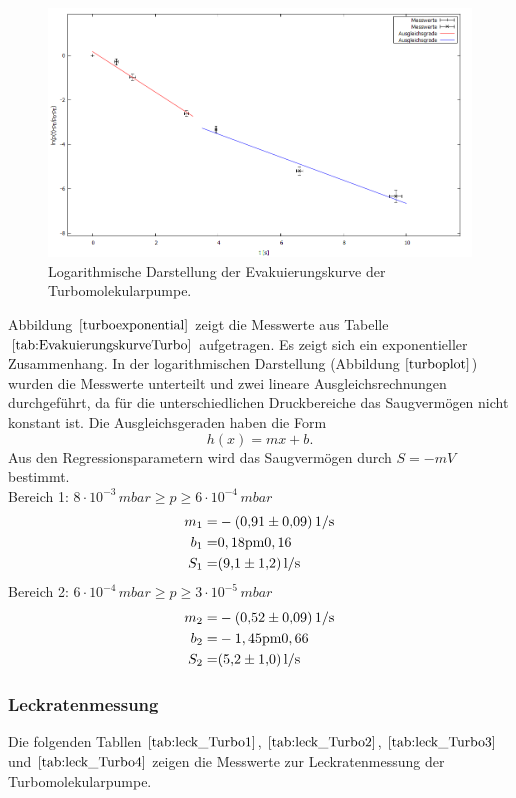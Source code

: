 \begin{figure}[H]
  \centering
  \includegraphics[width=14cm]{bilder/turbodruck plot.png}
  \caption{Logarithmische Darstellung der Evakuierungskurve der Turbomolekularpumpe.}
  \label{turboplot}
\end{figure}
Abbildung $\ref{turboexponential}$ zeigt die Messwerte aus Tabelle $\ref{tab:EvakuierungskurveTurbo}$ aufgetragen.
Es zeigt sich ein exponentieller Zusammenhang.
In der logarithmischen Darstellung (Abbildung $\ref{turboplot}$) wurden die Messwerte unterteilt und zwei lineare Ausgleichsrechnungen durchgeführt, da für die unterschiedlichen Druckbereiche das Saugvermögen nicht konstant ist.
Die Ausgleichsgeraden haben die Form
\begin{equation}
 h(x)=mx+b.
\end{equation}
Aus den Regressionsparametern wird das Saugvermögen durch $S=-mV$ bestimmt.\\

Bereich 1: $8 \cdot 10^{-3} \, \si{mbar} \geq p \geq 6 \cdot 10^{-4} \, \si{mbar}$\\
\begin{align*}
	m_1=& -\SI{0,91 \pm 0,09}{1/s}\\
	b_1=& \si{0,18 \pm 0,16}\\
	S_1=& \SI{9,1 \pm 1,2}{l/s}
\end{align*}
Bereich 2: $6 \cdot 10^{-4} \, \si{mbar} \geq p \geq 3 \cdot 10^{-5} \, \si{mbar}$\\
\begin{align*}
	m_2=& -\SI{0,52 \pm 0,09}{1/s}\\
	b_2=& -\si{1,45 \pm 0,66}\\
	S_2=& \SI{5,2 \pm 1,0}{l/s}
\end{align*}

\subsubsection{Leckratenmessung}
Die folgenden Tabllen $\ref{tab:leck_Turbo1}$, $\ref{tab:leck_Turbo2}$, $\ref{tab:leck_Turbo3}$ und $\ref{tab:leck_Turbo4}$ zeigen die Messwerte zur Leckratenmessung der Turbomolekularpumpe.


